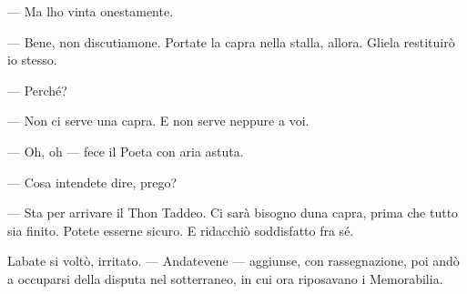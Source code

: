 --- Ma l\textquotesingle ho vinta onestamente.

--- Bene, non discutiamone. Portate la capra nella stalla, allora.
Gliela restituirò io stesso.

--- Perché?

--- Non ci serve una capra. E non serve neppure a voi.

--- Oh, oh --- fece il Poeta con aria astuta.

--- Cosa intendete dire, prego?

--- Sta per arrivare il Thon Taddeo. Ci sarà bisogno
d\textquotesingle una capra, prima che tutto sia finito. Potete esserne
sicuro. E ridacchiò soddisfatto fra sé.

L\textquotesingle abate si voltò, irritato. --- Andatevene --- aggiunse,
con rassegnazione, poi andò a occuparsi della disputa nel sotterraneo,
in cui ora riposavano i Memorabilia.
